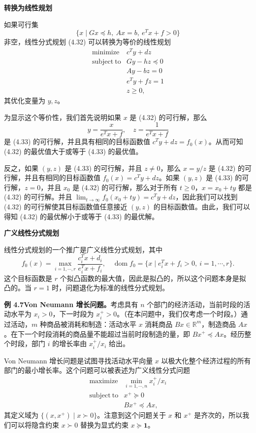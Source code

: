 \documentclass[UTF8, 12pt, fontset=fandol, oneside]{ctexart}
\begin{document}
\noindent\textbf{转换为线性规划}

如果可行集
\[
\{x\mid Gx\preceq h,\ Ax=b,\ e^Tx+f>0\}
\]
非空，线性分式规划 (4.32) 可以转换为等价的线性规划
\begin{equation}
\begin{array}{ll}
\mathop{\mathrm{minimize}} & c^Ty+dz\\
\mathrm{subject\ to} & Gy-hz\preceq 0\\
& Ay-bz=0\\
& e^Ty+fz=1\\
& z\geq 0,
\end{array}
\tag{4.33}
\end{equation}
其优化变量为 $y,z$。

为显示这个等价性，我们首先说明如果 $x$ 是 (4.32) 的可行解，那么
\[
y=\frac{x}{e^Tx+f},\quad z=\frac{1}{e^Tx+f}
\]
是 (4.33) 的可行解，并且具有相同的目标函数值 $c^Ty+dz=f_0(x)$。从而可知 (4.32) 的最优值大于或等于 (4.33) 的最优值。

反之，如果 $(y,z)$ 是 (4.33) 的可行解，并且 $z\neq 0$，那么 $x=y/z$ 是 (4.32) 的可行解，并且有相同的目标函数值 $f_0(x)=c^Ty+dz$。如果 $(y,z)$ 是 (4.33) 的可行解，$z=0$，并且 $x_0$ 是 (4.32) 的可行解，那么对于所有 $t\geq 0$，$x=x_0+ty$ 都是 (4.32) 的可行解。并且 $\lim_{t\to\infty}f_0(x_0+ty)=c^Ty+dz$，因此我们可以找到 (4.32) 的可行解使其目标函数值任意接近 $(y,z)$ 的目标函数值。由此，我们可以得知 (4.32) 的最优解小于或等于 (4.33) 的最优解。

\noindent\textbf{广义线性分式规划}

线性分式规划的一个推广是广义线性分式规划，其中
\[
f_0(x)=\max_{i=1,\cdots,r}\frac{c_i^Tx+d_i}{e_i^Tx+f_i},\quad
\operatorname{dom} f_0=\{x\mid e_i^Tx+f_i>0,\ i=1,\cdots,r\}.
\]
这个目标函数是 $r$ 个拟凸函数的最大值，因此是拟凸的，所以这个问题本身是拟凸的。当 $r=1$ 时，问题退化为标准的线性分式规划。

\noindent\textbf{例 4.7\quad Von Neumann 增长问题。}\quad 考虑具有 $n$ 个部门的经济活动，当前时段的活动水平为 $x_i>0$，下一时段为 $x_i^+>0$。（在本问题中，我们仅考虑一个时段。）通过活动，$m$ 种商品被消耗和制造：活动水平 $x$ 消耗商品 $Bx\in\mathbb{R}^m$，制造商品 $Ax$。在下一个时段消耗的商品量不能超过当前时段制造的量，即 $Bx^+\preceq Ax$。经历整个时段，部门 $i$ 的增长率由 $x_i^+/x_i$ 给出。

Von Neumann 增长问题是试图寻找活动水平向量 $x$ 以极大化整个经济过程的所有部门的最小增长率。这个问题可以被表述为广义线性分式问题
\[
\begin{array}{ll}
\mathop{\mathrm{maximize}} & \min_{i=1,\cdots,n} x_i^+/x_i\\
\mathrm{subject\ to} & x^+\succeq 0\\
& Bx^+\preceq Ax,
\end{array}
\]
其定义域为 $\{(x,x^+)\mid x\succ 0\}$。注意到这个问题关于 $x$ 和 $x^+$ 是齐次的，所以我们可以将隐含约束 $x\succ 0$ 替换为显式约束 $x\succeq \mathbf{1}$。
\end{document}
